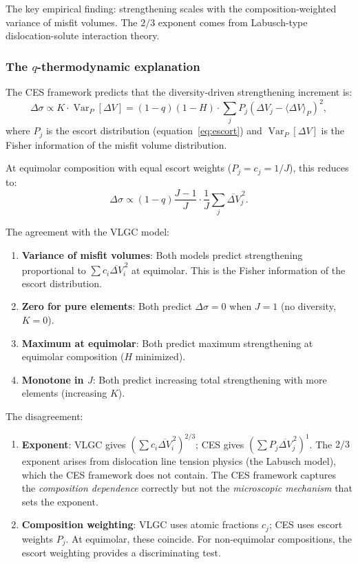 \documentclass[12pt,letterpaper]{article}
\theoremstyle{definition}
\DeclareMathOperator{\Var}{Var}
\begin{document}
The key empirical finding: strengthening scales with the composition-weighted variance of misfit volumes.  The $2/3$ exponent comes from Labusch-type dislocation-solute interaction theory.

\subsubsection{The $q$-thermodynamic explanation}

The CES framework predicts that the diversity-driven strengthening increment is:
\begin{equation}\label{eq:CES_strength}
  \Delta\sigma \propto K \cdot \Var_P[\Delta V] = (1-q)(1-H) \cdot \sum_j P_j (\Delta V_j - \langle \Delta V \rangle_P)^2,
\end{equation}
where $P_j$ is the escort distribution (equation~\ref{eq:escort}) and $\Var_P[\Delta V]$ is the Fisher information of the misfit volume distribution.

At equimolar composition with equal escort weights ($P_j = c_j = 1/J$), this reduces to:
\begin{equation}
  \Delta\sigma \propto (1-q)\frac{J-1}{J} \cdot \frac{1}{J}\sum_j \overline{\Delta V}_j^{\,2}.
\end{equation}

The agreement with the VLGC model:
\begin{enumerate}
  \item \textbf{Variance of misfit volumes}: Both models predict strengthening proportional to $\sum c_i \overline{\Delta V}_i^{\,2}$ at equimolar.  This is the Fisher information of the escort distribution. \checkmark
  \item \textbf{Zero for pure elements}: Both predict $\Delta\sigma = 0$ when $J = 1$ (no diversity, $K = 0$). \checkmark
  \item \textbf{Maximum at equimolar}: Both predict maximum strengthening at equimolar composition ($H$ minimized). \checkmark
  \item \textbf{Monotone in $J$}: Both predict increasing total strengthening with more elements (increasing $K$). \checkmark
\end{enumerate}

The disagreement:
\begin{enumerate}
  \item \textbf{Exponent}: VLGC gives $(\sum c_i \overline{\Delta V}_i^{\,2})^{2/3}$; CES gives $(\sum P_j \overline{\Delta V}_j^{\,2})^{1}$.  The $2/3$ exponent arises from dislocation line tension physics (the Labusch model), which the CES framework does not contain.  The CES framework captures the \emph{composition dependence} correctly but not the \emph{microscopic mechanism} that sets the exponent.
  \item \textbf{Composition weighting}: VLGC uses atomic fractions $c_j$; CES uses escort weights $P_j$.  At equimolar, these coincide.  For non-equimolar compositions, the escort weighting provides a discriminating test.
\end{enumerate}
\end{document}
